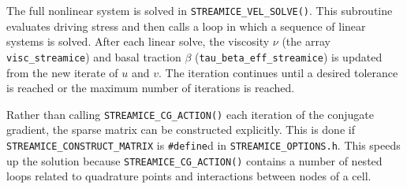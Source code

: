 The full nonlinear system is solved in \texttt{STREAMICE\_VEL\_SOLVE()}. This
subroutine evaluates driving stress and then calls a loop
in which a sequence of linear systems is solved. After each linear solve, the
viscosity $\nu$ (the array \texttt{visc\_streamice}) 
and basal traction $\beta$ (\texttt{tau\_beta\_eff\_streamice}) is updated from
the new iterate of $u$ and $v$. The iteration
continues until a desired tolerance is reached or the maximum number of
iterations is reached.

Rather than calling \texttt{STREAMICE\_CG\_ACTION()} each iteration of the conjugate gradient,
the sparse matrix can be constructed explicitly. This is done if \texttt{STREAMICE\_CONSTRUCT\_MATRIX}
is \texttt{\#define}d in \texttt{STREAMICE\_OPTIONS.h}. This speeds up the solution because \texttt{STREAMICE\_CG\_ACTION()}
contains a number of nested loops related to quadrature points and interactions between nodes of a cell.


